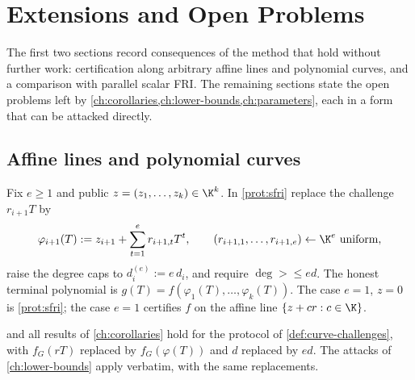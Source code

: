 \chapter{Extensions and Open Problems}
\label{ch:open}

The first two sections record consequences of the method that hold without further
work: certification along arbitrary affine lines and polynomial curves, and a comparison
with parallel scalar FRI. The remaining sections state the open problems left by
\cref{ch:corollaries,ch:lower-bounds,ch:parameters}, each in a form that can be attacked
directly.

\section{Affine lines and polynomial curves}

\begin{definition}\label{def:curve-challenges}
Fix $e\ge1$ and public $z=(z_1,\dots,z_k)\in\K^k$. In \cref{prot:sfri} replace the
challenge $r_{i+1}T$ by
\[
\varphi_{i+1}(T):=z_{i+1}+\sum_{t=1}^{e}r_{i+1,t}T^t,\qquad
(r_{i+1,1},\dots,r_{i+1,e})\leftarrow\K^e\ \text{uniform},
\]
raise the degree caps to $d_i^{(e)}:=e\,d_i$, and require $\deg\gt\le ed$. The honest
terminal polynomial is $g(T)=f(\varphi_1(T),\dots,\varphi_k(T))$. The case $e=1$, $z=0$ is
\cref{prot:sfri}; the case $e=1$ certifies $f$ on the affine line
$\{z+cr:c\in\K\}$.
\end{definition}

\begin{proposition}\label{prop:curves}
 and all results of \cref{ch:corollaries}
hold for the protocol of \cref{def:curve-challenges}, with $f_G(rT)$ replaced by
$f_G(\varphi(T))$ and $d$ replaced by $ed$. The attacks of \cref{ch:lower-bounds} apply
verbatim, with the same replacements.
\end{proposition}

